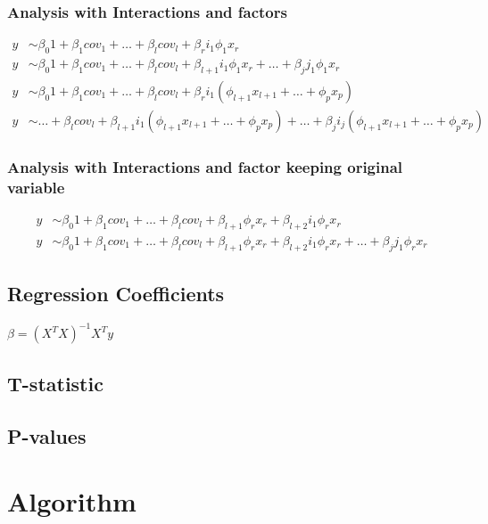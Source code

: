 \documentclass{report}
\begin{document}
\subsubsection{Analysis with Interactions and factors}
\begin{align}
y &\sim \beta_0 1 + \beta_1 cov_1 + \dots + \beta_l cov_l + \beta_r i_1 \phi_1 x_r\\
y &\sim \beta_0 1 + \beta_1 cov_1 + \dots + \beta_l cov_l + \beta_{l+1} i_1 \phi_1 x_r + \dots  + \beta_j j_1 \phi_1 x_r\\
y &\sim \beta_0 1 + \beta_1 cov_1 + \dots + \beta_l cov_l + \beta_{r}  i_1 \left( \phi_{l+1} x_{l+1}  + \dots + \phi_p x_p\right) \\
y &\sim  \dots + \beta_l cov_l + \beta_{l+1}  i_1 \left(  \phi_{l+1} x_{l+1}  + \dots +  \phi_{p} x_p\right) +\dots + \beta_{j}  i_j \left( \phi_{l+1} x_{l+1}  + \dots + \phi_{p} x_p\right)
\end{align}

\subsubsection{Analysis with Interactions and factor keeping original variable}
\begin{align}
y &\sim\beta_0 1 + \beta_1 cov_1 + \dots + \beta_l cov_l +  \beta_{l+1} \phi_{r} x_r +  \beta_{l+2} i_1 \phi_{r} x_r\\
y &\sim \beta_0 1 + \beta_1 cov_1 + \dots + \beta_l cov_l + \beta_{l+1} \phi_{r} x_r + \beta_{l+2} i_1 \phi_{r} x_r + \dots  + \beta_j j_1 \phi_{r} x_r
\end{align}


\subsection{Regression Coefficients}

$\beta=(X^T X)^{-1} X^T y$

\subsection{T-statistic}
\subsection{P-values}


\section{Algorithm}
\end{document}
